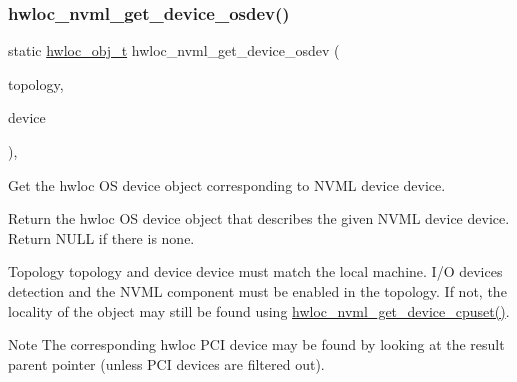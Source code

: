 \subsubsection{\texorpdfstring{hwloc\+\_\+nvml\+\_\+get\+\_\+device\+\_\+osdev()}{hwloc\_nvml\_get\_device\_osdev()}}
{\footnotesize\ttfamily static \hyperlink{a00185_ga79b8ab56877ef99ac59b833203391c7d}{hwloc\+\_\+obj\+\_\+t} hwloc\+\_\+nvml\+\_\+get\+\_\+device\+\_\+osdev (\begin{DoxyParamCaption}\item[{\hyperlink{a00186_ga9d1e76ee15a7dee158b786c30b6a6e38}{hwloc\+\_\+topology\+\_\+t}}]{topology,  }\item[{nvml\+Device\+\_\+t}]{device }\end{DoxyParamCaption})\hspace{0.3cm}{\ttfamily [inline]}, {\ttfamily [static]}}



Get the hwloc OS device object corresponding to N\+V\+ML device {\ttfamily device}. 

Return the hwloc OS device object that describes the given N\+V\+ML device {\ttfamily device}. Return N\+U\+LL if there is none.

Topology {\ttfamily topology} and device {\ttfamily device} must match the local machine. I/O devices detection and the N\+V\+ML component must be enabled in the topology. If not, the locality of the object may still be found using \hyperlink{a00221_ga26cf0036d09ec4d7cb692380fac9659d}{hwloc\+\_\+nvml\+\_\+get\+\_\+device\+\_\+cpuset()}.

\begin{DoxyNote}{Note}
The corresponding hwloc P\+CI device may be found by looking at the result parent pointer (unless P\+CI devices are filtered out). 
\end{DoxyNote}
\mbox{\label{a00221_gacd50fd0e2766ee05bc13234b46714756}} 
